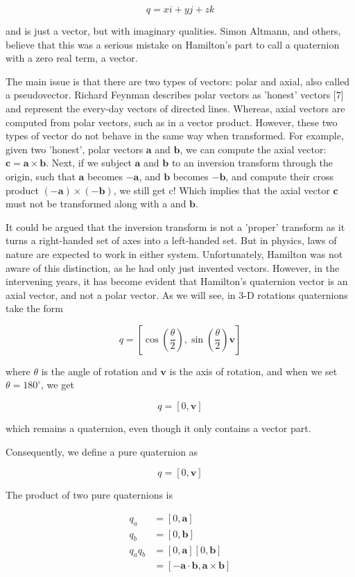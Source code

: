 $$
    q=x i+y j+z k
$$

and is just a vector, but with imaginary qualities. Simon Altmann, and others, believe that this was a serious mistake on Hamilton's part to call a quaternion with a zero real term, a vector.

The main issue is that there are two types of vectors: polar and axial, also called a pseudovector. Richard Feynman describes polar vectors as 'honest' vectors [7] and represent the every-day vectors of directed lines. Whereas, axial vectors are computed from polar vectors, such as in a vector product. However, these two types of vector do not behave in the same way when transformed. For example, given two 'honest', polar vectors $\mathbf{a}$ and $\mathbf{b}$, we can compute the axial vector: $\mathbf{c}=\mathbf{a} \times \mathbf{b}$. Next, if we subject $\mathbf{a}$ and $\mathbf{b}$ to an inversion transform through the origin, such that $\mathbf{a}$ becomes $-\mathbf{a}$, and $\mathbf{b}$ becomes $-\mathbf{b}$, and compute their cross product $(-\mathbf{a}) \times(-\mathbf{b})$, we still get c! Which implies that the axial vector $\mathbf{c}$ must not be transformed along with a and $\mathbf{b}$.

It could be argued that the inversion transform is not a 'proper' transform as it turns a right-handed set of axes into a left-handed set. But in physics, laws of nature are expected to work in either system. Unfortunately, Hamilton was not aware of this distinction, as he had only just invented vectors. However, in the intervening years, it has become evident that Hamilton's quaternion vector is an axial vector, and not a polar vector. As we will see, in 3-D rotations quaternions take the form

$$
    q=\left[\cos \left(\frac{\theta}{2}\right), \sin \left(\frac{\theta}{2}\right) \mathbf{v}\right]
$$

where $\theta$ is the angle of rotation and $\mathbf{v}$ is the axis of rotation, and when we set $\theta=180^{\circ}$, we get

$$
    q=[0, \mathbf{v}]
$$

which remains a quaternion, even though it only contains a vector part.

Consequently, we define a pure quaternion as

$$
    q=[0, \mathbf{v}]
$$

The product of two pure quaternions is

$$
    \begin{aligned}
        q_{a}       & =[0, \mathbf{a}]                                              \\
        q_{b}       & =[0, \mathbf{b}]                                              \\
        q_{a} q_{b} & =[0, \mathbf{a}][0, \mathbf{b}]                               \\
                    & =[-\mathbf{a} \cdot \mathbf{b}, \mathbf{a} \times \mathbf{b}]
    \end{aligned}
$$

